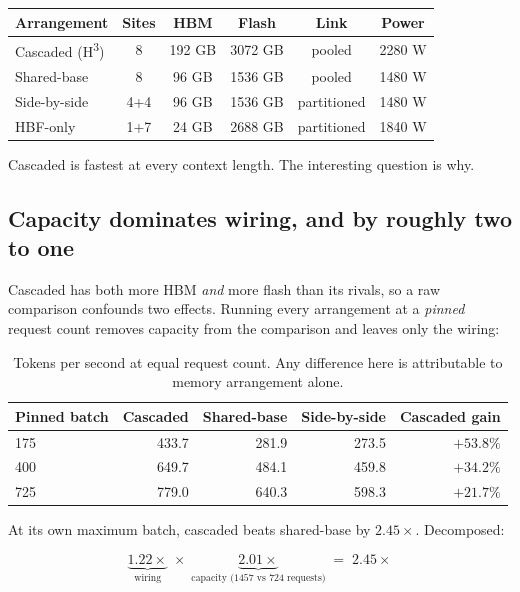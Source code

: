 \documentclass[11pt,a4paper]{article}
\begin{document}
\begin{table}[h]
\centering\small
\begin{tabular}{@{}lccccc@{}}
\toprule
\textbf{Arrangement} & \textbf{Sites} & \textbf{HBM} & \textbf{Flash} & \textbf{Link} & \textbf{Power} \\
\midrule
Cascaded (H\textsuperscript{3}) & 8   & 192 GB & 3072 GB & pooled      & 2280 W \\
Shared-base                     & 8   & 96 GB  & 1536 GB & pooled      & 1480 W \\
Side-by-side                    & 4+4 & 96 GB  & 1536 GB & partitioned & 1480 W \\
HBF-only                        & 1+7 & 24 GB  & 2688 GB & partitioned & 1840 W \\
\bottomrule
\end{tabular}
\end{table}

Cascaded is fastest at every context length. The interesting question is why.

\subsection{Capacity dominates wiring, and by roughly two to one}

Cascaded has both more HBM \emph{and} more flash than its rivals, so a raw
comparison confounds two effects. Running every arrangement at a
\emph{pinned} request count removes capacity from the comparison and leaves
only the wiring:

\begin{table}[h]
\centering\small
\begin{tabular}{@{}lrrrr@{}}
\toprule
\textbf{Pinned batch} & \textbf{Cascaded} & \textbf{Shared-base} & \textbf{Side-by-side} & \textbf{Cascaded gain} \\
\midrule
175 & 433.7 & 281.9 & 273.5 & $+53.8\%$ \\
400 & 649.7 & 484.1 & 459.8 & $+34.2\%$ \\
725 & 779.0 & 640.3 & 598.3 & $+21.7\%$ \\
\bottomrule
\end{tabular}
\caption{Tokens per second at equal request count. Any difference here is
attributable to memory arrangement alone.}
\end{table}

At its own maximum batch, cascaded beats shared-base by $2.45\times$. Decomposed:

\[
  \underbrace{1.22\times}_{\text{wiring}} \;\times\;
  \underbrace{2.01\times}_{\text{capacity (1457 vs 724 requests)}}
  \;=\; 2.45\times
\]
\end{document}
